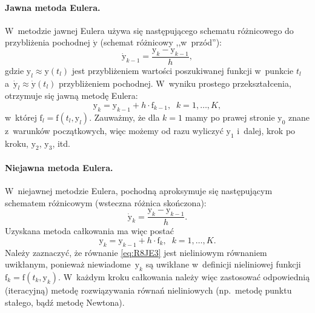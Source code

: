 \documentclass[paper=a4,DIV=12]{lpas}
\newcommand{\brm}[1]{\bm{\mathrm{#1}}}
\begin{document}
\begin{appendices}
\paragraph{Jawna metoda Eulera.}
W~metodzie jawnej Eulera używa się następującego schematu różnicowego do
przybliżenia pochodnej $\dot{\brm{y}}$ (schemat różnicowy ,,w~przód''):
\begin{equation}
  \dot{\brm{y}}_{k-1} = \frac{\brm{y}_{k} - \brm{y}_{k-1}}{h},
  \label{eq:IHSVX}
\end{equation}
gdzie $\brm{y}_{l} \approx \brm{y}\left(t_l\right)$ jest przybliżeniem wartości
poszukiwanej funkcji w~punkcie $t_l$ a~$\dot{\brm{y}}_{l} \approx
\dot{\brm{y}}(t_l)$ przybliżeniem pochodnej. W~wyniku prostego przekształcenia,
otrzymuje się jawną metodę Eulera:
\begin{equation}
  \brm{y}_k = \brm{y}_{k-1} + h \cdot \brm{f}_{k-1},\;\;k = 1,\dots,K,
 \label{eq:3PVVU}
\end{equation}
w~której $\brm{f}_l = \brm{f}\left(t_l, \brm{y}_l\right)$. Zauważmy, że dla
$k=1$ mamy po prawej stronie $\brm{y}_0$ znane z~warunków początkowych, więc
możemy od razu wyliczyć $\brm{y}_1$ i~dalej, krok po kroku, $\brm{y}_2$,
$\brm{y}_3$, itd.

\paragraph{Niejawna metoda Eulera.}
W~niejawnej metodzie Eulera, pochodną aproksymuje się następującym schematem
różnicowym (wsteczna różnica skończona):
\begin{equation}
  \dot{\brm{y}}_k = \frac{\brm{y}_{k} - \brm{y}_{k-1}}{h}.
  \label{eq:YNJO9}
\end{equation}
Uzyskana metoda całkowania ma więc postać
\begin{equation}
  \brm{y}_k = \brm{y}_{k-1} + h \cdot \brm{f}_{k},\;\;k = 1,\dots,K.
  \label{eq:R8JE3}
\end{equation}
Należy zaznaczyć, że równanie \eqref{eq:R8JE3} jest nieliniowym równaniem
uwikłanym, ponieważ niewiadome~$\brm{y}_k$ są uwikłane w~definicji nieliniowej
funkcji $\brm{f}_k = \brm{f}(t_k,\brm{y}_k)$. W~każdym kroku całkowania należy
więc zastosować odpowiednią (iteracyjną) metodę rozwiązywania równań
nieliniowych (np.~metodę punktu stałego, bądź metodę Newtona).


\end{appendices}
\end{document}
